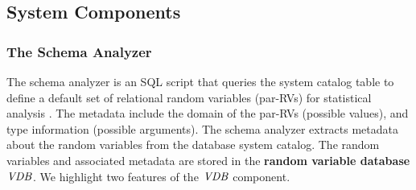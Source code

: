 \documentclass[letterpaper]{article}
\begin{document}
%








\subsection{System Components}  

\subsubsection{The Schema Analyzer} The schema analyzer is an SQL script that queries the system catalog table to define a default set of relational random variables (par-RVs) for statistical analysis \cite{Kimmig2015}. 
The metadata include the domain of the par-RVs (possible values), and type information (possible arguments). The schema analyzer extracts metadata about the random variables from the database system catalog.
The random variables and associated metadata are stored in the \textbf{random variable database} ${\it VDB }$. We highlight two features of the ${\it VDB }$ component. 
\end{document}
